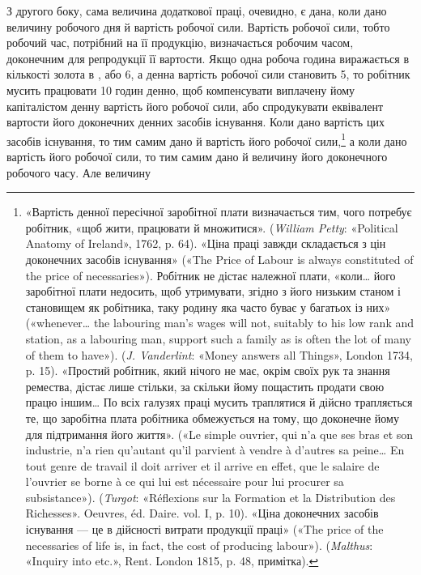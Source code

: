 З другого боку, сама величина додаткової праці, очевидно,
є дана, коли дано величину робочого дня й вартість робочої
сили. Вартість робочої сили, тобто робочий час, потрібний на її
продукцію, визначається робочим часом, доконечним для репродукції
її вартости. Якщо одна робоча година виражається в
кількості золота в , або 6, а денна вартість робочої
сили становить 5, то робітник мусить працювати
10 годин денно, щоб компенсувати виплачену йому капіталістом
денну вартість його робочої сили, або спродукувати еквівалент
вартости його доконечних денних засобів існування. Коли дано
вартість цих засобів існування, то тим самим дано й вартість його
робочої сили,\footnote{
«Вартість денної пересічної заробітної плати визначається тим,
чого потребує робітник, «щоб жити, працювати й множитися». (\emph{William
Petty}: «Political Anatomy of Ireland», 1762, p. 64). «Ціна праці
завжди складається з цін доконечних засобів існування» («The Price of
Labour is always constituted of the price of necessaries»). Робітник не дістає
належної плати, «коли\dots{} його заробітної плати недосить, щоб утримувати,
згідно з його низьким станом і становищем як робітника, таку родину
яка часто буває у багатьох із них» («whenever\dots{} the labouring man’s
wages will not, suitably to his low rank and station, as a labouring man,
support such a family as is often the lot of many of them to have»).
(\emph{J. Vanderlint}: «Money answers all Things», London 1734, p. 15). «Простий
робітник, який нічого не має, окрім своїх рук та знання ремества, дістає
лише стільки, за скільки йому пощастить продати свою працю іншим\dots{}
По всіх галузях праці мусить траплятися й дійсно трапляється те, що
заробітна плата робітника обмежується на тому, що доконечне йому
для підтримання його життя». («Le simple ouvrier, qui n’a que ses bras
et son industrie, n’a rien qu’autant qu’il parvient à vendre à d’autres sa
peine\dots{} En tout genre de travail il doit arriver et il arrive en effet, que le
salaire de l’ouvrier se borne à ce qui lui est nécessaire pour lui procurer
sa subsistance»). (\emph{Turgot}: «Réflexions sur la Formation et la Distribution
des Richesses». Oeuvres, éd. Daire. vol. I, p. 10). «Ціна доконечних
засобів існування — це в дійсності витрати продукції праці» («The
price of the necessaries of life is, in fact, the cost of producing labour»).
(\emph{Malthus}: «Inquiry into etc.», Rent. London 1815, p. 48, примітка).
} а коли дано вартість його робочої сили, то тим
самим дано й величину його доконечного робочого часу. Але величину
